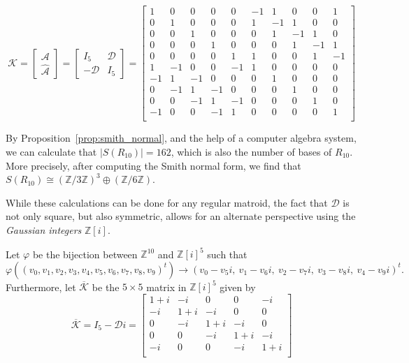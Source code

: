 \documentclass[12p]{amsart}
\numberwithin{equation}{section}
\theoremstyle{plain}
\theoremstyle{definition}
\newcommand{\Z}{\mathbb {Z}}
\begin{document}
\[\mathcal K = \begin{bmatrix} \mathcal A\\ \widehat{\mathcal A} \end{bmatrix} = \begin{bmatrix} I_5 & \mathcal D \\ -\mathcal D & I_5 \end{bmatrix}= \begin{bmatrix}
    1 & 0 & 0 & 0 & 0 &   -1 & 1 & 0 & 0 & 1\\
    0 & 1 & 0 & 0 & 0 &   1 & -1 & 1 & 0 & 0\\
    0 & 0 & 1 & 0 & 0 &   0 & 1 & -1 & 1 & 0\\
    0 & 0 & 0 & 1 & 0 &   0 & 0 & 1 & -1 & 1\\
    0 & 0 & 0 & 0 & 1 &   1 & 0 & 0 & 1 & -1\\
    1 & -1 & 0 & 0 & -1 &  1 & 0 & 0 & 0 & 0\\
    -1 & 1 & -1 & 0 & 0 &  0 & 1 & 0 & 0 & 0\\
    0 & -1 & 1 & -1 & 0 &  0 & 0 & 1 & 0 & 0\\
    0 & 0 & -1 & 1 & -1 &  0 & 0 & 0 & 1 & 0\\
    -1 & 0 & 0 & -1 & 1 &  0 & 0 & 0 & 0 & 1\\
\end{bmatrix}\]

By Proposition~\ref{prop:smith_normal}, and the help of a computer algebra system, we can calculate that $|S(R_{10})| = 162$, which is also the number of bases of $R_{10}$. More precisely, after computing the Smith normal form, we find that $S(R_{10}) \cong (\Z/3\Z)^3 \oplus (\Z/6\Z)$.

While these calculations can be done for any regular matroid, the fact that $\mathcal D$ is not only square, but also symmetric, allows for an alternate perspective using the \emph{Gaussian integers} $\Z[i]$.

Let $\varphi$ be the bijection between $\Z^{10}$ and $\Z[i]^5$ such that 
\[\varphi((v_0,v_1,v_2,v_3,v_4,v_5,v_6,v_7,v_8,v_9)^t) \to (v_0 - v_5i,~v_1 - v_6i,~v_2 - v_7i,~v_3 - v_8i,~v_4 - v_9i)^t.\]
Furthermore, let $\overline{\mathcal K}$ be the $5\times 5$ matrix in $\Z[i]^5$ given by 
\[\overline{\mathcal K} =  I_5 - \mathcal D i =\begin{bmatrix}
    1 + i & -i & 0 & 0 & -i \\
    -i & 1 + i & -i & 0 & 0 \\
    0 & -i & 1 + i & -i & 0 \\
    0 & 0 & -i & 1 + i & -i \\
    -i & 0 & 0 & -i & 1 + i \\
\end{bmatrix}\]
\end{document}
